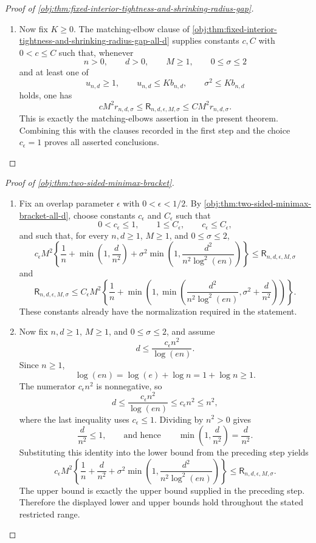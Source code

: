 \documentclass[11pt]{article}
\begin{document}
\begin{proof}[Proof of \cref{obj:thm:fixed-interior-tightness-and-shrinking-radius-gap}]
\begin{enumerate}
\item Now fix \(K\ge0\).  The matching-elbow clause of \cref{obj:thm:fixed-interior-tightness-and-shrinking-radius-gap-all-d} supplies constants \(c,C\) with \(0<c\le C\) such that, whenever
\[
n>0,\qquad d>0,\qquad M\ge1,\qquad 0\le\sigma\le2
\]
and at least one of
\[
u_{n,d}\ge1,\qquad
u_{n,d}\le Kb_{n,d},\qquad
\sigma^2\le Kb_{n,d}
\]
holds, one has
\[
cM^2r_{n,d,\sigma}
\le
\mathsf R_{n,d,\epsilon,M,\sigma}
\le
CM^2r_{n,d,\sigma}.
\]
This is exactly the matching-elbows assertion in the present theorem.  Combining this with the clauses recorded in the first step and the choice \(c_\epsilon=1\) proves all asserted conclusions.  %
\end{enumerate}
\end{proof}

\begin{proof}[Proof of \cref{obj:thm:two-sided-minimax-bracket}]
\begin{enumerate}
\item Fix an overlap parameter \(\epsilon\) with \(0<\epsilon<1/2\).  By \cref{obj:thm:two-sided-minimax-bracket-all-d}, choose constants \(c_{\epsilon}\) and \(C_{\epsilon}\) such that
\[
0<c_{\epsilon}\le 1,\qquad 1\le C_{\epsilon},\qquad c_{\epsilon}\le C_{\epsilon},
\]
and such that, for every \(n,d\ge1\), \(M\ge1\), and \(0\le\sigma\le2\),
\[
c_{\epsilon}M^2
\left\{
\frac1n+\min\left(1,\frac{d}{n^2}\right)
+\sigma^2\min\left(1,\frac{d^2}{n^2\log^2(en)}\right)
\right\}
\le
\mathsf R_{n,d,\epsilon,M,\sigma}
\]
and
\[
\mathsf R_{n,d,\epsilon,M,\sigma}
\le
C_{\epsilon}M^2
\left\{
\frac1n+
\min\left(1,\min\left(\frac{d^2}{n^2\log^2(en)},\sigma^2+\frac{d}{n^2}\right)\right)
\right\}.
\]
These constants already have the normalization required in the statement. %

\item Now fix \(n,d\ge1\), \(M\ge1\), and \(0\le\sigma\le2\), and assume
\[
d\le \frac{c_{\epsilon}n^2}{\log(en)} .
\]
Since \(n\ge1\),
\[
\log(en)=\log(e)+\log n=1+\log n\ge1.
\]
The numerator \(c_{\epsilon}n^2\) is nonnegative, so
\[
d\le \frac{c_{\epsilon}n^2}{\log(en)}
\le c_{\epsilon}n^2
\le n^2,
\]
where the last inequality uses \(c_{\epsilon}\le1\).  Dividing by \(n^2>0\) gives
\[
\frac{d}{n^2}\le1,
\qquad\text{and hence}\qquad
\min\left(1,\frac{d}{n^2}\right)=\frac{d}{n^2}.
\]
Substituting this identity into the lower bound from the preceding step yields
\[
c_{\epsilon}M^2\left\{
\frac{1}{n}+\frac{d}{n^2}
+\sigma^2\min\left(1,\frac{d^2}{n^2\log^2(en)}\right)
\right\}
\le
\mathsf R_{n,d,\epsilon,M,\sigma}.
\]
The upper bound is exactly the upper bound supplied in the preceding step.  Therefore the displayed lower and upper bounds hold throughout the stated restricted range. %
\end{enumerate}
\end{proof}
\end{document}
